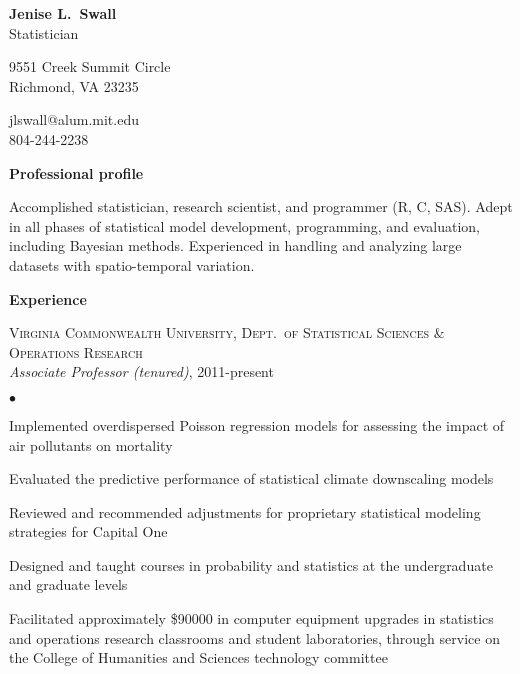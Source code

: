 \documentclass[11pt]{article}
\def\newsectn{\vspace*{0.8cm}}
\def\newempl{\vspace*{0.5cm}}
\begin{document}
\thispagestyle{empty}


\begin{center}
{\Large{\textbf{Jenise L.~Swall}}}\\
{\Large{Statistician}}
\end{center}

\begin{minipage}[t]{0.33\textwidth}
9551 Creek Summit Circle\\
Richmond, VA 23235
\end{minipage}
\hfill
\begin{minipage}[t]{0.33\textwidth}
\begin{flushright}
jlswall@alum.mit.edu\\
804-244-2238
\end{flushright}
\end{minipage}


\vspace*{0.8cm}



\noindent \textbf{Professional profile}

Accomplished statistician, research scientist, and programmer (R, C,
SAS).  Adept in all phases of statistical model development,
programming, and evaluation, including Bayesian methods.
Experienced in handling and analyzing large datasets with
spatio-temporal variation.



\newsectn



\noindent \textbf{Experience}  %


\textsc{Virginia Commonwealth University, Dept.\ of Statistical Sciences \& Operations Research}\\ %
\textit{Associate Professor (tenured)}, 2011-present

\begin{list}{$\bullet$}{
\setlength{\topsep}{0cm}
\setlength{\partopsep}{0cm}
\setlength{\parsep}{0cm}
\setlength{\itemsep}{0cm}
\setlength{\labelsep}{1ex}
\setlength{\labelwidth}{1em}
\setlength{\leftmargin}{1em}
}
\item Implemented overdispersed Poisson regression models for assessing the impact of air pollutants on mortality
\item Evaluated the predictive performance of statistical climate
  downscaling models
\item Reviewed and recommended adjustments for proprietary statistical
  modeling strategies for Capital One
\item Designed and taught courses in probability and statistics at the
undergraduate and graduate levels
\item Facilitated approximately \$90000 in computer equipment upgrades in statistics and operations research classrooms and student laboratories, through service on the College of Humanities and Sciences technology committee 
\end{list}
\end{document}
